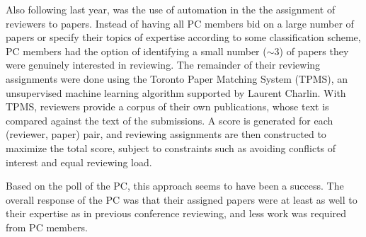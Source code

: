 Also following last year, was the use of automation in the the assignment of
reviewers to papers.  Instead of having all PC members bid on a large number
of papers or specify their topics of expertise according to some
classification scheme, PC members had the option of identifying a small number
($\sim\!3$) of papers they were genuinely interested in reviewing. The
remainder of their reviewing assignments were done using the Toronto Paper
Matching System (TPMS), an unsupervised machine learning algorithm supported
by Laurent Charlin. With TPMS, reviewers provide a corpus of their own
publications, whose text is compared against the text of the submissions. A
score is generated for each (reviewer, paper) pair, and reviewing assignments
are then constructed to maximize the total score, subject to constraints such
as avoiding conflicts of interest and equal reviewing load. 

Based on the poll of the PC, this approach seems to have been a success.  The
overall response of the PC was that their assigned papers were at least as
well to their expertise as in previous conference reviewing, and less work was
required from PC members.


